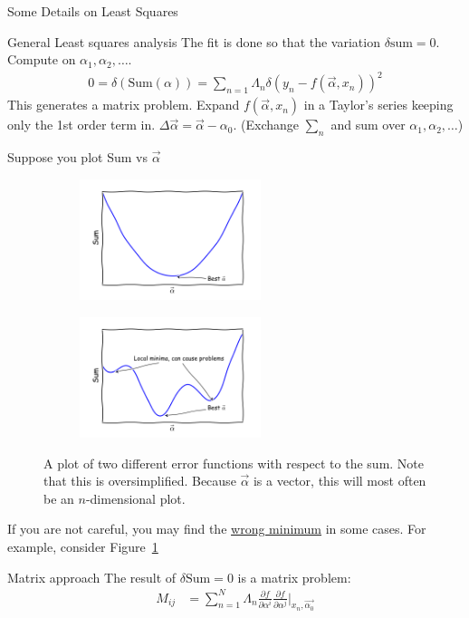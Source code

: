 \documentclass{article}
\newcommand{\pOne}[2]{\frac{\partial #1}{\partial #2}}
\begin{document}
\begin{section}{Some Details on Least Squares}
\begin{subsection}{General Least squares analysis}
	The fit is done so that the variation $\delta\text{sum} = 0$. Compute on $\alpha_1,\alpha_2,\ldots$.
	\begin{align*}
		0 = \delta(\text{Sum}(\alpha)) = \sum_{n=1}\Lambda_n \delta(y_n - f(\vec{\alpha},x_n))^2
	\end{align*}
	This generates a matrix problem. Expand $f(\vec{\alpha},x_n)$ in a Taylor's series keeping only the 1st order term in. $\Delta\vec{\alpha} = \vec{\alpha} - \alpha_0$.
	(Exchange $\sum\limits_n$ and sum over $\alpha_1, \alpha_2,\ldots$)
\begin{subsection}{Suppose you plot Sum vs $\vec{\alpha}$}
	\begin{figure}[h]
		\centering
		\begin{subfigure}[b]{0.4\textwidth}
		\centering
		\includegraphics[height=100pt]{singleMinimum}
		\end{subfigure}
		\begin{subfigure}[b]{0.4\textwidth}
			\centering
			\includegraphics[height=100pt]{multipleMinima}
		\end{subfigure}
		\caption{A plot of two different error functions with respect to the sum. Note that this is oversimplified. Because $\vec{\alpha}$ is a vector, this will most often be an $n$-dimensional plot.}
		\label{fig:plots}
	\end{figure}
	If you are not careful, you may find the \underline{wrong minimum} in some cases. For example, consider Figure~\ref{fig:plots}
\end{subsection}
\begin{subsection}{Matrix approach}
	The result of $\delta\text{Sum} = 0$ is a matrix problem:
	\begin{align*}
		M_{ij}&=\sum_{n=1}^{N}\Lambda_n \pOne{f}{\alpha^i}\pOne{f}{\alpha^j}|_{x_n,\vec{\alpha_0}}\\

\end{align*}
\end{subsection}
\end{subsection}
\end{section}
\end{document}
